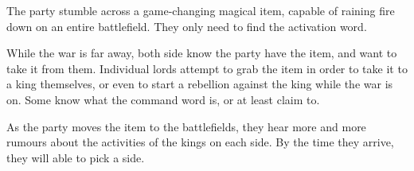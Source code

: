 {{\begin{multicols}{2}
The party stumble across a game-changing magical item, capable of raining fire down on an entire battlefield.
They only need to find the activation word.

While the war is far away, both side know the party have the item, and want to take it from them.
Individual lords attempt to grab the item in order to take it to a king themselves, or even to start a rebellion against the king while the war is on.
Some know what the command word is, or at least claim to.

As the party moves the item to the battlefields, they hear more and more rumours about the activities of the kings on each side.
By the time they arrive, they will able to pick a side.

\end{multicols}

}{}
}{}
